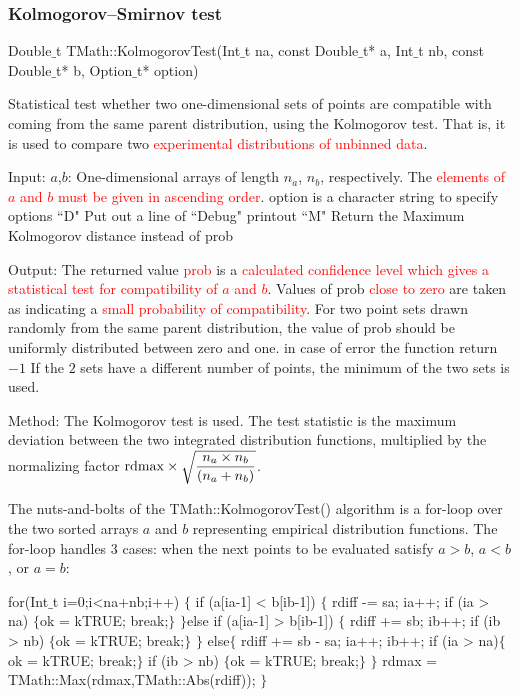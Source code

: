 \documentclass[12pt,a4paper]{article}
\begin{document}
\subsubsection{Kolmogorov–Smirnov test}

Double$\_$t TMath::KolmogorovTest(Int$\_$t na, const Double$\_$t* a, Int$\_$t nb, const Double$\_$t* b, Option$\_$t* 	option)	

Statistical test whether two one-dimensional sets of points are compatible with coming from the same parent distribution, using the Kolmogorov test. That is, it is used to compare two \textcolor{red}{experimental distributions of unbinned data}.

Input: $a$,$b$: One-dimensional arrays of length $n_a$, $n_b$, respectively. The \textcolor{red}{elements of $a$ and $b$ must be given in ascending order}. option is a character string to specify options ``D" Put out a line of ``Debug" printout ``M" Return the Maximum Kolmogorov distance instead of prob

Output: The returned value \textcolor{red}{prob} is a \textcolor{red}{calculated confidence level which gives a statistical test for compatibility of $a$ and $b$}. Values of prob \textcolor{red}{close to zero} are taken as indicating a \textcolor{red}{small probability of compatibility}. For two point sets drawn randomly from the same parent distribution, the value of prob should be uniformly distributed between zero and one. in case of error the function return $-1$ If the $2$ sets have a different number of points, the minimum of the two sets is used.

Method: The Kolmogorov test is used. The test statistic is the maximum deviation between the two integrated distribution functions, multiplied by the normalizing factor ${\rm rdmax}\times \sqrt{\dfrac{n_a\times n_b}{(n_a+n_b)}}$.

The nuts-and-bolts of the TMath::KolmogorovTest() algorithm is a for-loop over the two sorted arrays $a$ and $b$ representing empirical distribution functions. The for-loop handles $3$ cases: when the next points to be evaluated satisfy $a>b$, $a<b$, or $a=b$:

for(Int$\_$t i=0;i<na+nb;i++) $\{$ if (a[ia-1] < b[ib-1]) $\{$ rdiff -= sa; ia++; if (ia > na) $\{$ok = kTRUE; break;$\}$ $\} $else if (a[ia-1] > b[ib-1]) $\{$ rdiff += sb; ib++; if (ib > nb) $\{$ok = kTRUE; break;$\}$ $\}$ else$\{$ rdiff += sb - sa; ia++; ib++; if (ia > na)$\{$ok = kTRUE; break;$\}$ if (ib > nb) $\{$ok = kTRUE; break;$\}$ $\}$ rdmax = TMath::Max(rdmax,TMath::Abs(rdiff)); $\}$
\end{document}

